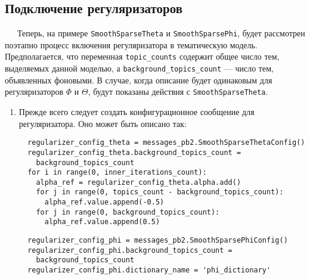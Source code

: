 \subsection{Подключение регуляризаторов}

$\quad\;\:$Теперь, на примере \verb|SmoothSparseTheta| и \verb|SmoothSparsePhi|, будет рассмотрен поэтапно процесс включения регуляризатора в тематическую модель. Предполагается, что переменная \verb|topic_counts| содержит общее число тем, выделяемых данной моделью, а \verb|background_topics_count| --- число тем, объявленных фоновыми. В случае, когда описание будет одинаковым для регуляризаторов $\Phi$ и $\Theta$, будут показаны действия с \verb|SmoothSparseTheta|.

\begin{enumerate}
	\item Прежде всего следует создать конфигурационное сообщение для регуляризатора. Оно может быть описано так:
	
	\vspace{4pt}
        \verb|  regularizer_config_theta = messages_pb2.SmoothSparseThetaConfig()| \\
        \verb|  regularizer_config_theta.background_topics_count = | \\
        \verb|    background_topics_count| \\
        \verb|  for i in range(0, inner_iterations_count):| \\
        \verb|    alpha_ref = regularizer_config_theta.alpha.add()| \\
        \verb|    for j in range(0, topics_count - background_topics_count):| \\
        \verb|      alpha_ref.value.append(-0.5)| \\
        \verb|    for j in range(0, background_topics_count):| \\
        \verb|      alpha_ref.value.append(0.5)|
	\vspace{4pt}
	
	\vspace{4pt}
        \verb|  regularizer_config_phi = messages_pb2.SmoothSparsePhiConfig()| \\
        \verb|  regularizer_config_phi.background_topics_count = | \\
        \verb|    background_topics_count| \\
        \verb|  regularizer_config_phi.dictionary_name = 'phi_dictionary'|
	\vspace{4pt}	
	

\end{enumerate}
